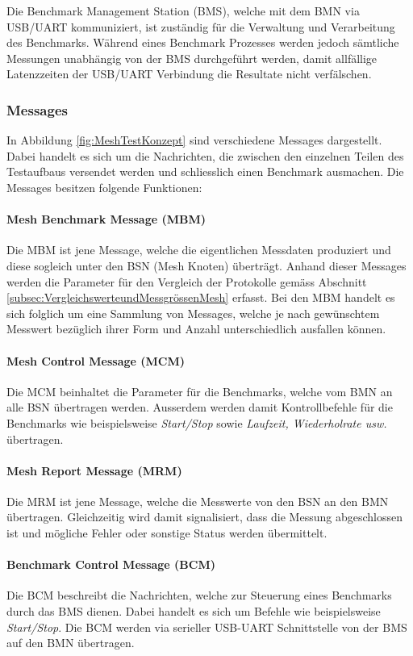 Die Benchmark Management Station (BMS), welche mit dem BMN via USB/UART kommuniziert, ist zuständig für die Verwaltung und Verarbeitung des Benchmarks. Während eines Benchmark Prozesses werden jedoch sämtliche Messungen unabhängig von der BMS durchgeführt werden, damit allfällige Latenzzeiten der USB/UART Verbindung die Resultate nicht verfälschen.

\subsubsection{Messages}\label{subsubsec:Messages}
In Abbildung \ref{fig:MeshTestKonzept} sind verschiedene Messages dargestellt. Dabei handelt es sich um die Nachrichten, die zwischen den einzelnen Teilen des Testaufbaus versendet werden und schliesslich einen Benchmark ausmachen. Die Messages besitzen folgende Funktionen:

\paragraph{Mesh Benchmark Message (MBM)}
Die MBM ist jene Message, welche die eigentlichen Messdaten produziert und diese sogleich unter den BSN (Mesh Knoten) überträgt. Anhand dieser Messages werden die Parameter für den Vergleich der Protokolle gemäss Abschnitt \ref{subsec:VergleichswerteundMessgrössenMesh} erfasst. Bei den MBM handelt es sich folglich um eine Sammlung von Messages, welche je nach gewünschtem Messwert bezüglich ihrer Form und Anzahl unterschiedlich ausfallen können.

\paragraph{Mesh Control Message (MCM)}
Die MCM beinhaltet die Parameter für die Benchmarks, welche vom BMN an alle BSN übertragen werden. Ausserdem werden damit Kontrollbefehle für die Benchmarks wie beispielsweise \textit{Start/Stop} sowie \textit{Laufzeit, Wiederholrate usw.} übertragen.

\paragraph{Mesh Report Message (MRM)}
Die MRM ist jene Message, welche die Messwerte von den BSN an den BMN übertragen. Gleichzeitig wird damit signalisiert, dass die Messung abgeschlossen ist und mögliche Fehler oder sonstige Status werden übermittelt.

\paragraph{Benchmark Control Message (BCM)}
Die BCM beschreibt die Nachrichten, welche zur Steuerung eines Benchmarks durch das BMS dienen. Dabei handelt es sich um Befehle wie beispielsweise \textit{Start/Stop}. Die BCM werden via serieller USB-UART Schnittstelle von der BMS auf den BMN übertragen.

